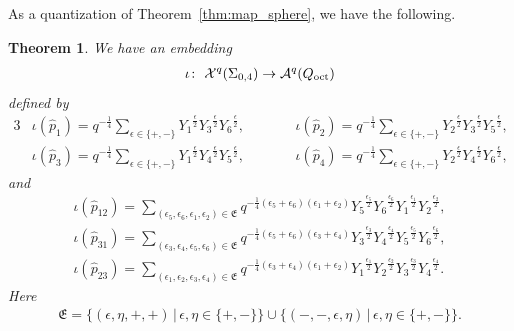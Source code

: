 \documentclass[10pt,a4paper]{amsart}
\numberwithin{equation}{section}
\newtheorem{Theorem}{Theorem}[section]
\begin{document}
As a quantization of Theorem~\ref{thm:map_sphere}, we have the following.

\begin{Theorem} \label{thm:qW_for_sphere} We have an embedding
 \begin{gather*}
 \iota\colon \ \mathcal{X}^q(\Sigma_{0,4}) \to \mathcal{A}^q(Q_{\text{\rm oct}})
 \end{gather*}
 defined by
 \begin{alignat}{3}
& \iota(\hat{p}_1) = q^{-\frac{1}{4}} \sum_{\epsilon\in \{+,-\} } {Y_1}^{\frac{\epsilon}{2}} {Y_3}^{\frac{\epsilon}{2}} {Y_6}^{\frac{\epsilon}{2}} ,\qquad
 & &\iota(\hat{p}_2) = q^{-\frac{1}{4}} \sum_{\epsilon\in \{+,-\} } {Y_2}^{\frac{\epsilon}{2}} {Y_3}^{\frac{\epsilon}{2}} {Y_5}^{\frac{\epsilon}{2}} , & \nonumber\\
 & \iota(\hat{p}_3) = q^{-\frac{1}{4}} \sum_{\epsilon\in \{+,-\} } {Y_1}^{\frac{\epsilon}{2}} {Y_4}^{\frac{\epsilon}{2}} {Y_5}^{\frac{\epsilon}{2}} ,\qquad & &
 \iota(\hat{p}_4) = q^{-\frac{1}{4}} \sum_{\epsilon\in \{+,-\} } {Y_2}^{\frac{\epsilon}{2}} {Y_4}^{\frac{\epsilon}{2}} {Y_6}^{\frac{\epsilon}{2}} ,&\label{qp_YYY}
 \end{alignat}
 and
\begin{gather*}
\iota(\hat{p}_{12}) = \sum_{ ( \epsilon_5, \epsilon_6,\epsilon_1, \epsilon_2) \in \mathfrak{E} } q^{-\frac{1}{4} (\epsilon_5+\epsilon_6) (\epsilon_1+\epsilon_2) } {Y_5}^{\frac{\epsilon_5}{2}}
 {Y_6}^{\frac{\epsilon_6}{2}} {Y_1}^{\frac{\epsilon_1}{2}} {Y_2}^{\frac{\epsilon_2}{2}} , \\
 \iota( \hat{p}_{31} ) = \sum_{ (\epsilon_3, \epsilon_4, \epsilon_5, \epsilon_6) \in \mathfrak{E} } q^{-\frac{1}{4} (\epsilon_5+\epsilon_6) (\epsilon_3+\epsilon_4) }
 {Y_3}^{\frac{\epsilon_3}{2}} {Y_4}^{\frac{\epsilon_4}{2}} {Y_5}^{\frac{\epsilon_5}{2}} {Y_6}^{\frac{\epsilon_6}{2}} , \\
 \iota(\hat{p}_{23}) = \sum_{ (\epsilon_1, \epsilon_2, \epsilon_3, \epsilon_4) \in \mathfrak{E} } q^{-\frac{1}{4} (\epsilon_3+\epsilon_4) (\epsilon_1+\epsilon_2) } {Y_1}^{\frac{\epsilon_1}{2}}
 {Y_2}^{\frac{\epsilon_2}{2}} {Y_3}^{\frac{\epsilon_3}{2}} {Y_4}^{\frac{\epsilon_4}{2}} .
\end{gather*}
Here
\begin{gather*}
 \mathfrak{E} = \{ ( \epsilon, \eta, +, + ) \,|\, \epsilon , \eta \in \{+, - \} \} \cup \{ ( -, -, \epsilon, \eta ) \,|\, \epsilon , \eta \in \{+, - \}\} .
\end{gather*}
\end{Theorem}
\end{document}
